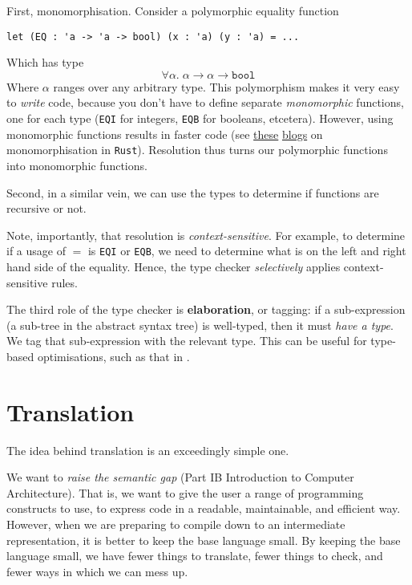 {First, monomorphisation. Consider a polymorphic equality function
\begin{verbatim}
let (EQ : 'a -> 'a -> bool) (x : 'a) (y : 'a) = ...
\end{verbatim}
Which has type
\[\forall \alpha. \; \alpha \to \alpha \to \texttt{bool}\]
Where $\alpha$ ranges over any arbitrary type. This polymorphism makes it very easy to \textit{write} code, because you don't have to define separate \textit{monomorphic} functions, one for each type (\texttt{EQI} for integers, \texttt{EQB} for booleans, etcetera). However, using monomorphic functions results in faster code (see \href{https://doc.rust-lang.org/book/ch10-01-syntax.html#performance-of-code-using-generics}{these} \href{https://rustc-dev-guide.rust-lang.org/backend/monomorph.html#monomorphization}{blogs} on monomorphisation in \texttt{Rust}). Resolution thus turns our polymorphic functions into monomorphic functions.

Second, in a similar vein, we can use the types to determine if functions are recursive or not.

Note, importantly, that resolution is \textit{context-sensitive}. For example, to determine if a usage of $=$ is \texttt{EQI} or \texttt{EQB}, we need to determine what is on the left and right hand side of the equality. Hence, the type checker \textit{selectively} applies context-sensitive rules.

The third role of the type checker is \textbf{elaboration}, or tagging: if a sub-expression (a sub-tree in the abstract syntax tree) is well-typed, then it must \textit{have a type}. We tag that sub-expression with the relevant type. This can be useful for type-based optimisations, such as that in .

\section{Translation}\label{section:translation-goals}
The idea behind translation is an exceedingly simple one. 

We want to \textit{raise the semantic gap} (\textsf{Part IB Introduction to Computer Architecture}). That is, we want to give the user a range of programming constructs to use, to express code in a readable, maintainable, and efficient way. However, when we are preparing to compile down to an intermediate representation, it is better to keep the base language small. By keeping the base language small, we have fewer things to translate, fewer things to check, and fewer ways in which we can mess up. 

}
